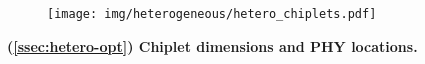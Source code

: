 \begin{figure}[H]
\centering
\captionsetup{justification=centering}
\begin{subfigure}{0.99 \columnwidth}
\centering
\texttt{[image: img/heterogeneous/hetero\_chiplets.pdf]}
\end{subfigure}
\caption{\textbf{(\textsection \ref{ssec:hetero-opt}) Chiplet dimensions and PHY locations.}}
\label{fig:hetero-chiplets}
\vspace{-1em}
\end{figure}
